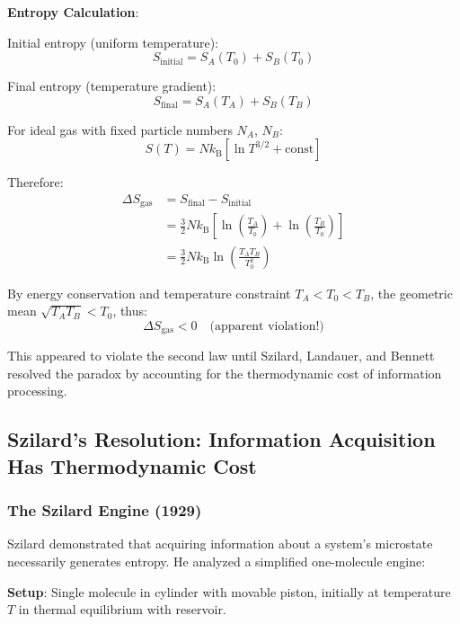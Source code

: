 \documentclass[11pt,a4paper]{article}
\newcommand{\kB}{k_\text{B}}
\begin{document}
\textbf{Entropy Calculation}:

Initial entropy (uniform temperature):
\begin{equation}
S_{\text{initial}} = S_A(T_0) + S_B(T_0)
\end{equation}

Final entropy (temperature gradient):
\begin{equation}
S_{\text{final}} = S_A(T_A) + S_B(T_B)
\end{equation}

For ideal gas with fixed particle numbers $N_A$, $N_B$:
\begin{equation}
S(T) = N \kB \left[ \ln T^{3/2} + \text{const} \right]
\end{equation}

Therefore:
\begin{align}
\Delta S_{\text{gas}} &= S_{\text{final}} - S_{\text{initial}} \\
&= \frac{3}{2} N \kB \left[ \ln\left(\frac{T_A}{T_0}\right) + \ln\left(\frac{T_B}{T_0}\right) \right] \\
&= \frac{3}{2} N \kB \ln\left(\frac{T_A T_B}{T_0^2}\right)
\end{align}

By energy conservation and temperature constraint $T_A < T_0 < T_B$, the geometric mean $\sqrt{T_A T_B} < T_0$, thus:
\begin{equation}
\Delta S_{\text{gas}} < 0 \quad \text{(apparent violation!)}
\end{equation}

This appeared to violate the second law until Szilard, Landauer, and Bennett resolved the paradox by accounting for the thermodynamic cost of information processing.

\subsection{Szilard's Resolution: Information Acquisition Has Thermodynamic Cost}

\subsubsection{The Szilard Engine (1929)}

Szilard demonstrated that acquiring information about a system's microstate necessarily generates entropy\cite{szilard1929entropy}. He analyzed a simplified one-molecule engine:

\textbf{Setup}: Single molecule in cylinder with movable piston, initially at temperature $T$ in thermal equilibrium with reservoir.
\end{document}
